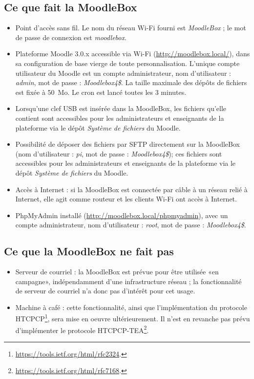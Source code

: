 \documentclass[11pt]{article}
\begin{document}
\subsection{Ce que fait la MoodleBox}

\begin{itemize}
\item Point d'accès sans fil. Le nom du réseau Wi-Fi fourni est \emph{MoodleBox} ; le mot de passe de connexion est \emph{moodlebox}.
\item Plateforme Moodle 3.0.x accessible via Wi-Fi (\url{http://moodlebox.local/}), dans sa configuration de base vierge de toute personnalisation. L'unique compte utilisateur du Moodle est un compte administrateur, nom d'utilisateur : \emph{admin}, mot de passe : \emph{Moodlebox4\$}. La taille maximale des dépôts de fichiers est fixée à 50~Mo. Le cron est lancé toutes les 3 minutes.
\item Lorsqu'une clef USB est insérée dans la MoodleBox, les fichiers qu'elle contient sont accessibles pour les administrateurs et enseignants de la plateforme via le dépôt \emph{Système de fichiers} du Moodle.
\item Possibilité de déposer des fichiers par SFTP directement sur la MoodleBox (nom d'utilisateur : \emph{pi}, mot de passe : \emph{Moodlebox4\$}); ces fichiers sont accessibles pour les administrateurs et enseignants de la plateforme via le dépôt \emph{Système de fichiers} du Moodle.
\item Accès à Internet : si la MoodleBox est connectée par câble à un réseau relié à Internet, elle agit comme routeur et les clients Wi-Fi ont accès à Internet.
\item PhpMyAdmin installé (\url{http://moodlebox.local/phpmyadmin}), avec un compte administrateur, nom d'utilisateur : \emph{root}, mot de passe : \emph{Moodlebox4\$}.
\end{itemize}

\subsection{Ce que la MoodleBox ne fait pas}

\begin{itemize}
\item Serveur de courriel : la MoodleBox est prévue pour être utilisée «en campagne», indépendamment d'une infrastructure réseau ; la fonctionnalité de serveur de courriel n'a donc pas d'intérêt pour cet usage.
\item Machine à café : cette fonctionnalité, ainsi que l'implémentation du protocole HTCPCP\footnote{\url{https://tools.ietf.org/html/rfc2324}.}, sera mise en oeuvre ultérieurement. Il n'est en revanche pas prévu d'implémenter le protocole HTCPCP-TEA\footnote{\url{https://tools.ietf.org/html/rfc7168}.}.
\end{itemize}
\end{document}
